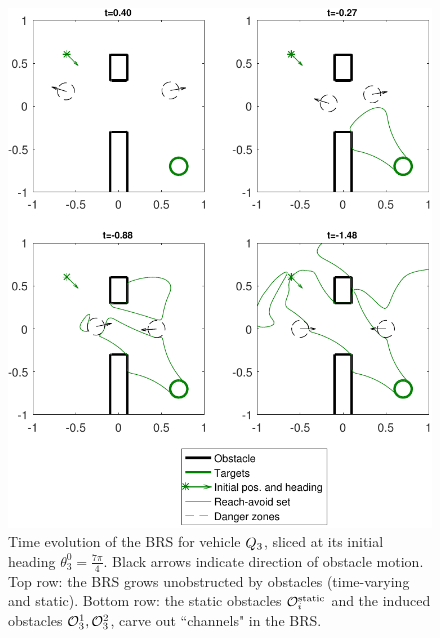 \begin{figure}
	\centering
	\includegraphics[width=0.9\columnwidth]{fig/dubins_reach_3}
	\caption{Time evolution of the BRS for vehicle $Q_3$, sliced at its initial heading $\theta_3^0=\frac{7\pi}{4}$. Black arrows indicate direction of obstacle motion. Top row: the BRS grows unobstructed by obstacles (time-varying and static). Bottom row: the static obstacles $\mathcal{O}^\text{static}_i$ and the induced obstacles $\mathcal{O}_3^1,\mathcal{O}_3^2$, carve out ``channels" in the BRS.}
	\label{fig:dubins_reach_3}
\end{figure}

